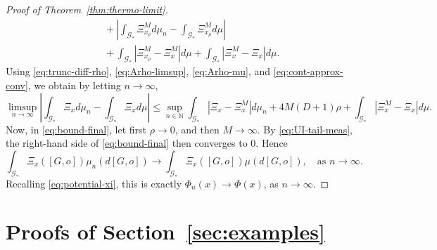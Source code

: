 \documentclass[11pt]{article}
\newcommand{\N}{{\mathbb N}}
\newcommand{\be}{\begin{equation}}
\newcommand{\ee}{\end{equation}}
\numberwithin{equation}{section}
\begin{document}
\begin{proof}[Proof of Theorem~\ref{thm:thermo-limit}]
\begin{align*}
&\quad
+
\left|
\int_{\mathcal G_\ast}\Xi_{x_\rho}^Md\mu_n
-
\int_{\mathcal G_\ast}\Xi_{x_\rho}^Md\mu
\right| \\
&\quad
+
\int_{\mathcal G_\ast}|\Xi_{x_\rho}^M-\Xi_x^M|d\mu
+
\int_{\mathcal G_\ast}|\Xi_x^M-\Xi_x|d\mu.
\end{align*}
Using \eqref{eq:trunc-diff-rho}, \eqref{eq:Arho-limsup}, \eqref{eq:Arho-mu}, and \eqref{eq:cont-approx-conv}, we obtain by letting \(n\to\infty\),
\be\label{eq:bound-final}
\limsup_{n\to\infty}
\left|\int_{\mathcal G_\ast}\Xi_xd\mu_n-\int_{\mathcal G_\ast}\Xi_xd\mu\right|
\le
\sup_{n\in\N}\int_{\mathcal G_\ast}|\Xi_x-\Xi_x^M|d\mu_n
+
4M(D+1)\rho
+
\int_{\mathcal G_\ast}|\Xi_x^M-\Xi_x|d\mu.
\ee
Now, in \eqref{eq:bound-final}, let first \(\rho\to 0\), and then \(M\to\infty\). By \eqref{eq:UI-tail-meas}, the right-hand side of \eqref{eq:bound-final} then converges to \(0\). Hence
\[
\int_{\mathcal G_\ast}\Xi_x([G,o])\mu_n(d[G,o])
\longrightarrow
\int_{\mathcal G_\ast}\Xi_x([G,o])\mu(d[G,o]),\quad \text{as } n \to \infty.
\]
Recalling \eqref{eq:potential-xi}, this is exactly \(\Phi_n(x)\to\Phi(x)\), as $n\rightarrow \infty$.
\end{proof}


\section{Proofs of Section~\ref{sec:examples}}\label{sec:proofs-examples}
\end{document}
